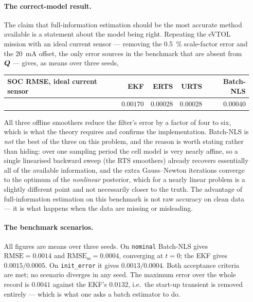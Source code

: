 \paragraph{The correct-model result.}  The claim that full-information estimation should be the most
accurate method available is a statement about the model being right.  Repeating the eVTOL mission
with an ideal current sensor --- removing the \SI{+0.5}{\percent} scale-factor error and the
\SI{20}{\milli\ampere} offset, the only error sources in the benchmark that are absent from $\bm{Q}$ ---
gives, as means over three seeds,
\begin{center}
\begin{tabular}{@{}lrrrr@{}}
\toprule
SOC RMSE, ideal current sensor & EKF & ERTS & URTS & Batch-NLS\\
\midrule
 & $0.00170$ & $0.00028$ & $0.00028$ & $0.00040$\\
\bottomrule
\end{tabular}
\end{center}
All three offline smoothers reduce the filter's error by a factor of four to six, which is what the
theory requires and confirms the implementation.  Batch-NLS is \emph{not} the best of the three on
this problem, and the reason is worth stating rather than hiding: over one sampling period the cell
model is very nearly affine, so a single linearised backward sweep (the RTS smoothers) already
recovers essentially all of the available information, and the extra Gauss--Newton iterations
converge to the optimum of the \emph{nonlinear} posterior, which for a nearly linear problem is a
slightly different point and not necessarily closer to the truth.  The advantage of
full-information estimation on this benchmark is not raw accuracy on clean data --- it is what
happens when the data are missing or misleading.

\paragraph{The benchmark scenarios.}  All figures are means over three seeds.  On \texttt{nominal}
Batch-NLS gives $\text{RMSE}=0.0014$ and $\text{RMSE}_\text{ss}=0.0004$, converging at $t=0$; the
EKF gives $0.0015/0.0005$.  On \texttt{init\_error} it gives $0.0013/0.0004$.  Both acceptance
criteria are met; no scenario diverges in any seed.  The maximum error over the whole record is
$0.0041$ against the EKF's $0.0132$, i.e.\ the start-up transient is removed entirely --- which is
what one asks a batch estimator to do.

